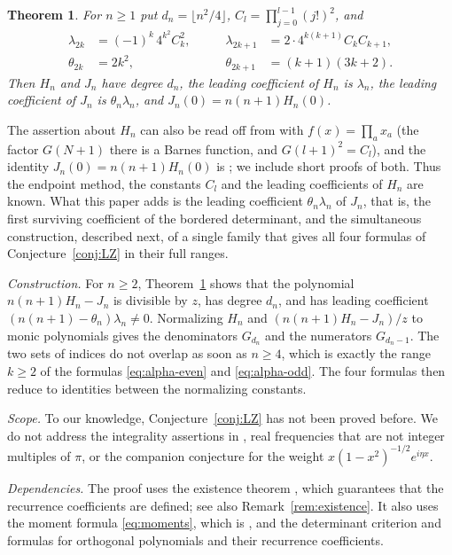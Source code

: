 \documentclass[11pt]{amsart}
\newtheorem{theorem}{Theorem}[section]
\theoremstyle{remark}
\numberwithin{equation}{section}
\begin{document}
\begin{theorem}\label{thm:leading}
For $n\ge1$ put $d_n=\lfloor n^2/4\rfloor$, $C_l=\prod_{j=0}^{l-1}(j!)^2$, and
\[
\begin{aligned}
\lambda_{2k}&=(-1)^k\,4^{k^2}C_k^2, &\qquad \lambda_{2k+1}&=2\cdot4^{k(k+1)}C_kC_{k+1},\\
\theta_{2k}&=2k^2, &\qquad \theta_{2k+1}&=(k+1)(3k+2).
\end{aligned}
\]
Then $H_n$ and $J_n$ have degree $d_n$, the leading coefficient of $H_n$ is $\lambda_n$, the leading coefficient of $J_n$ is $\theta_n\lambda_n$, and $J_n(0)=n(n+1)H_n(0)$.
\end{theorem}

The assertion about $H_n$ can also be read off from \cite[Theorem~3.8]{CDHI} with $f(x)=\prod_ax_a$ (the factor $G(N+1)$ there is a Barnes function, and $G(l+1)^2=C_l$), and the identity $J_n(0)=n(n+1)H_n(0)$ is \cite[(2.8)]{MC}; we include short proofs of both. Thus the endpoint method, the constants $C_l$ and the leading coefficients of $H_n$ are known. What this paper adds is the leading coefficient $\theta_n\lambda_n$ of $J_n$, that is, the first surviving coefficient of the bordered determinant, and the simultaneous construction, described next, of a single family that gives all four formulas of Conjecture~\ref{conj:LZ} in their full ranges.

\emph{Construction.} For $n\ge2$, Theorem~\ref{thm:leading} shows that the polynomial $n(n+1)H_n-J_n$ is divisible by $z$, has degree $d_n$, and has leading coefficient $(n(n+1)-\theta_n)\lambda_n\ne0$. Normalizing $H_n$ and $(n(n+1)H_n-J_n)/z$ to monic polynomials gives the denominators $G_{d_n}$ and the numerators $G_{d_n-1}$. The two sets of indices do not overlap as soon as $n\ge4$, which is exactly the range $k\ge2$ of the formulas \eqref{eq:alpha-even} and \eqref{eq:alpha-odd}. The four formulas then reduce to identities between the normalizing constants.

\emph{Scope.} To our knowledge, Conjecture~\ref{conj:LZ} has not been proved before. We do not address the integrality assertions in \cite[Conjecture~3.1]{MC}, real frequencies that are not integer multiples of $\pi$, or the companion conjecture \cite[Conjecture~3.7]{LZ} for the weight $x(1-x^2)^{-1/2}e^{i\eta x}$.

\emph{Dependencies.} The proof uses the existence theorem \cite[Theorem~2.3]{MC}, which guarantees that the recurrence coefficients are defined; see also Remark~\ref{rem:existence}. It also uses the moment formula \eqref{eq:moments}, which is \cite[(2.5)]{MC}, and the determinant criterion and formulas \cite[Theorem~2.2, (3.2)]{MC} for orthogonal polynomials and their recurrence coefficients.
\end{document}
